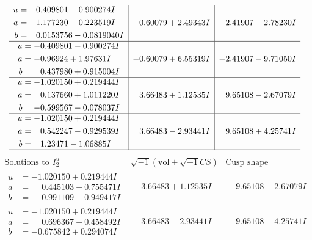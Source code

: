 \documentclass[1p]{elsarticle_modified}
\theoremstyle{definition}
\newcommand{\I}{\sqrt{-1}}
\begin{document}
$$\begin{array}{c|c|c}
\begin{aligned}
u &= -0.409801 - 0.900274 I \\
a &= \phantom{-}1.177230 - 0.223519 I \\
b &= \phantom{-}0.0153756 - 0.0819040 I\end{aligned}
 & -0.60079 + 2.49343 I & -2.41907 - 2.78230 I \\ \hline\begin{aligned}
u &= -0.409801 - 0.900274 I \\
a &= -0.96924 + 1.97631 I \\
b &= \phantom{-}0.437980 + 0.915004 I\end{aligned}
 & -0.60079 + 6.55319 I & -2.41907 - 9.71050 I \\ \hline\begin{aligned}
u &= -1.020150 + 0.219444 I \\
a &= \phantom{-}0.137660 + 1.011220 I \\
b &= -0.599567 - 0.078037 I\end{aligned}
 & \phantom{-}3.66483 + 1.12535 I & \phantom{-}9.65108 - 2.67079 I \\ \hline\begin{aligned}
u &= -1.020150 + 0.219444 I \\
a &= \phantom{-}0.542247 - 0.929539 I \\
b &= \phantom{-}1.23471 - 1.06885 I\end{aligned}
 & \phantom{-}3.66483 - 2.93441 I & \phantom{-}9.65108 + 4.25741 I\\
 \hline 
 \end{array}$$\newpage$$\begin{array}{c|c|c}  
\text{Solutions to }I^u_{2}& \I (\text{vol} + \sqrt{-1}CS) & \text{Cusp shape}\\
 \hline 
\begin{aligned}
u &= -1.020150 + 0.219444 I \\
a &= \phantom{-}0.445103 + 0.755471 I \\
b &= \phantom{-}0.991109 + 0.949417 I\end{aligned}
 & \phantom{-}3.66483 + 1.12535 I & \phantom{-}9.65108 - 2.67079 I \\ \hline\begin{aligned}
u &= -1.020150 + 0.219444 I \\
a &= \phantom{-}0.696367 - 0.458492 I \\
b &= -0.675842 + 0.294074 I\end{aligned}
 & \phantom{-}3.66483 - 2.93441 I & \phantom{-}9.65108 + 4.25741 I \\ \hline\begin{aligned}

\end{aligned}
\end{array}$$
\end{document}
